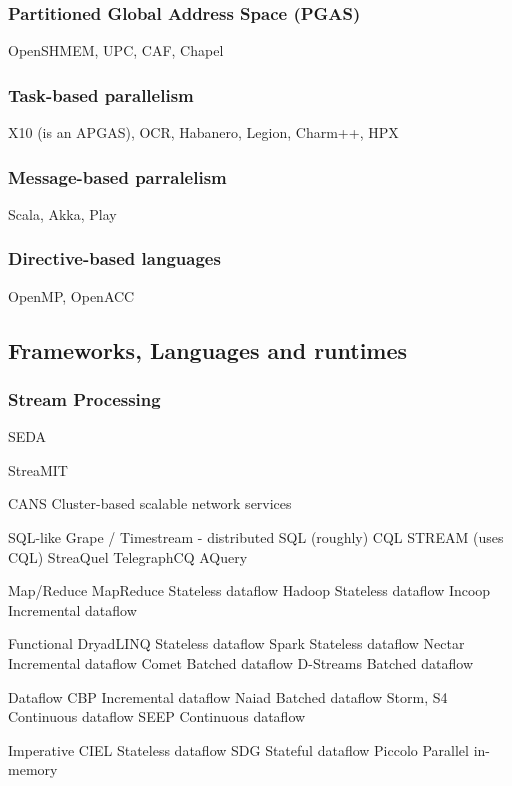 \subsubsection{Partitioned Global Address Space (PGAS)}
OpenSHMEM, UPC, CAF, Chapel


\subsubsection{Task-based parallelism}
X10 (is an APGAS), OCR, Habanero, Legion, Charm++, HPX

\subsubsection{Message-based parralelism}
Scala, Akka, Play

\subsubsection{Directive-based languages}
OpenMP, OpenACC





\subsection{Frameworks, Languages and runtimes}

\subsubsection{Stream Processing}

SEDA

StreaMIT

CANS Cluster-based scalable network services

SQL-like
  Grape / Timestream - distributed SQL (roughly)
  CQL
  STREAM (uses CQL)
  StreaQuel
  TelegraphCQ
  AQuery

Map/Reduce
  MapReduce    Stateless dataflow
  Hadoop       Stateless dataflow
  Incoop       Incremental dataflow

Functional
  DryadLINQ    Stateless dataflow
  Spark        Stateless dataflow
  Nectar       Incremental dataflow
  Comet        Batched dataflow
  D-Streams    Batched dataflow

Dataflow
  CBP          Incremental dataflow
  Naiad        Batched dataflow
  Storm, S4    Continuous dataflow
  SEEP         Continuous dataflow

Imperative
  CIEL         Stateless dataflow
  SDG          Stateful dataflow
  Piccolo      Parallel in-memory